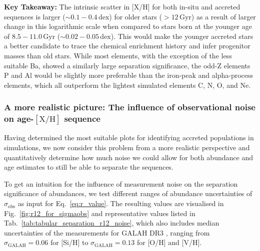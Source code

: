 \documentclass[fleqn,usenatbib]{mnras}
\begin{document}
\textbf{Key Takeaway:} The intrinsic scatter in {[X/H]} for both in-situ and accreted sequences is larger ($\sim 0.1-0.4\,\mathrm{dex}$) for older stars ($> 12\,\mathrm{Gyr}$) as a result of larger change in this logarithmic scale when compared to stars born at the younger age of $8.5-11.0\,\mathrm{Gyr}$ ($\sim 0.02-0.05\,\mathrm{dex}$). This would make the younger accreted stars a better candidate to trace the chemical enrichment history and infer progenitor masses than old stars. While most elements, with the exception of the less suitable Ba, showed a similarly large separation significance, the odd-Z elements P and Al would be slightly more preferable than the iron-peak and alpha-process elements, which all outperform the lightest simulated elements C, N, O, and Ne.

\subsubsection{A more realistic picture: The influence of observational noise on age-{$\mathrm{[X/H]}$} sequence} \label{sec:noise_influence}

Having determined the most suitable plots for identifying accreted populations in simulations, we now consider this problem from a more realistic perspective and quantitatively determine how much noise we could allow for both abundance and age estimates to still be able to separate the sequences.

To get an intuition for the influence of measurement noise on the separation significance of abundances, we test different ranges of abundance uncertainties of $\sigma_\mathrm{obs}$ as input for Eq.~\ref{eq:r_value}. The resulting values are visualised in Fig.~\ref{fig:r12_for_sigmaobs} and representative values listed in Tab.~\ref{tab:tabular_separation_r12_noise}, which also includes median uncertainties of the measurements for GALAH DR3 \citep{Buder2021}, ranging from $\sigma_\mathrm{GALAH} = 0.06$ for [Si/H] to $\sigma_\mathrm{GALAH} = 0.13$ for [O/H] and [V/H].
\end{document}
